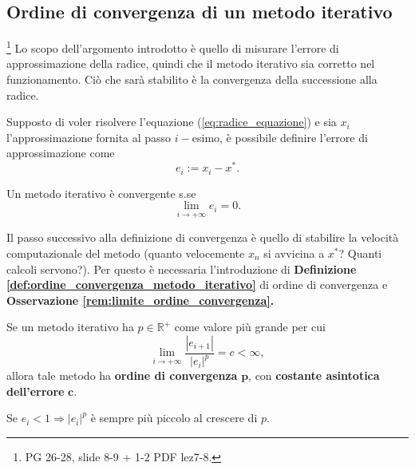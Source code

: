 \subsection{Ordine di convergenza di un metodo iterativo}\footnote{PG 26-28, slide 8-9 + 1-2 PDF lez7-8.} Lo scopo dell'argomento introdotto è quello di misurare l'errore di approssimazione della radice, quindi che il metodo iterativo sia corretto nel funzionamento. Ciò che sarà stabilito è la convergenza della successione alla radice.
\begin{definition}
	Supposto di voler risolvere l'equazione (\ref{eq:radice_equazione}) e sia $x_i$ l'approssimazione fornita al passo $i-$esimo, è possibile definire l'errore di approssimazione come
	\begin{equation}\label{eq:errore_metodo_iterativo}
		e_i:=x_i-x^*.
	\end{equation}
\end{definition} 

\begin{definition}
	Un metodo iterativo è convergente s.se \begin{equation}\label{eq:limite_errore_metodo_convergente}
		\lim_{i\to+\infty}{e_i}=0.
	\end{equation}
\end{definition}

Il passo successivo alla definizione di convergenza è quello di stabilire la velocità computazionale del metodo (quanto velocemente $x_n$ si avvicina a $x^*$? Quanti calcoli servono?). Per questo è necessaria l'introduzione di \textbf{Definizione \ref{def:ordine_convergenza_metodo_iterativo}} di ordine di convergenza e \textbf{Osservazione \ref{rem:limite_ordine_convergenza}.}
\begin{definition} \label{def:ordine_convergenza_metodo_iterativo}
	Se un metodo iterativo ha $p\in\mathbb R^+$ come valore più grande per cui
	 \begin{equation}\label{eq:limite_ordine_convergenza}
		\lim_{i\to + \infty}{\frac{|e_{i+1}|}{|e_i|^p}}=c<\infty,
	\end{equation}
	allora tale metodo ha \textbf{ordine di convergenza} $\boldsymbol p$, con \textbf{costante asintotica dell'errore} $\boldsymbol c$.
\end{definition}

\begin{remark}
	Se $e_i<1 \Rightarrow |e_i|^p$ è sempre più piccolo al crescere di $p$.
\end{remark}

